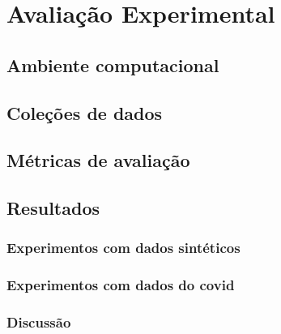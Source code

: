 \chapter{Avaliação Experimental}
\section{Ambiente computacional}



\section{Coleções de dados}

\section{Métricas de avaliação}




\section{Resultados}
\subsection{Experimentos com dados sintéticos}





\subsection{Experimentos com dados do covid}





\subsection{Discussão}

